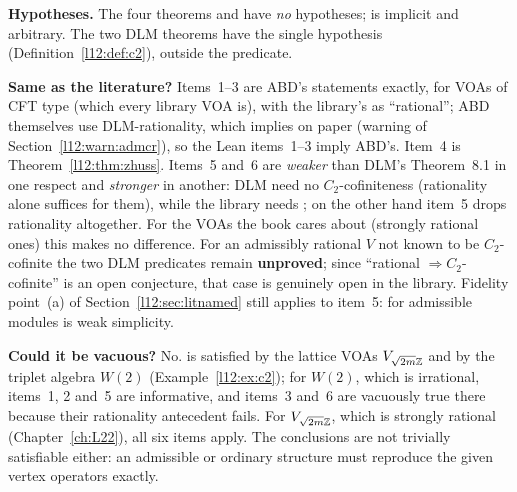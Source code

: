 \begin{dictionary}
\textbf{Hypotheses.} The four  theorems and  have \emph{no} hypotheses;  is
implicit and arbitrary. The two DLM theorems have the single hypothesis  (Definition~\ref{l12:def:c2}),
outside the predicate.

\textbf{Same as the literature?} Items~1--3 are ABD's statements exactly, for VOAs of CFT type (which every library VOA is),
with the library's  as ``rational''; ABD themselves use DLM-rationality, which implies
 on paper (warning of Section~\ref{l12:warn:admcr}), so the Lean items~1--3 imply ABD's. Item~4 is
Theorem~\ref{l12:thm:zhuss}. Items~5 and~6 are \emph{weaker} than DLM's Theorem~8.1 in one respect and \emph{stronger} in
another: DLM need no $C_2$-cofiniteness (rationality alone suffices for them), while the library needs ; on the other
hand item~5 drops rationality altogether. For the VOAs the book cares about (strongly rational ones) this makes no difference.
For an admissibly rational $V$ not known to be $C_2$-cofinite the two DLM predicates remain \textbf{unproved}; since
``rational $\Rightarrow C_2$-cofinite'' is an open conjecture, that case is genuinely open in the library. Fidelity point~(a)
of Section~\ref{l12:sec:litnamed} still applies to item~5:  for admissible modules is weak simplicity.

\textbf{Could it be vacuous?} No.  is satisfied by the lattice VOAs $V_{\sqrt{2m}{\mathbb{Z}}}$ and by the triplet
algebra $W(2)$ (Example~\ref{l12:ex:c2}); for $W(2)$, which is irrational, items~1, 2 and~5 are informative, and items~3
and~6 are vacuously true there because their rationality antecedent fails. For $V_{\sqrt{2m}{\mathbb{Z}}}$, which is strongly
rational (Chapter~\ref{ch:L22}), all six items apply. The conclusions are not trivially satisfiable either: an admissible
or ordinary structure must reproduce the given vertex operators exactly.
\end{dictionary}

